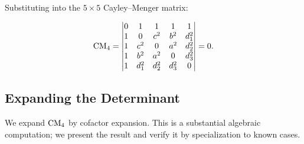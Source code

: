 Substituting into the $5 \times 5$ Cayley--Menger matrix:

\begin{equation}
\label{eq:cm-vdpp}
\mathrm{CM}_4 = \begin{vmatrix}
0 & 1 & 1 & 1 & 1 \\
1 & 0 & c^2 & b^2 & d_1^2 \\
1 & c^2 & 0 & a^2 & d_2^2 \\
1 & b^2 & a^2 & 0 & d_3^2 \\
1 & d_1^2 & d_2^2 & d_3^2 & 0
\end{vmatrix} = 0.
\end{equation}

\subsection{Expanding the Determinant}

We expand $\mathrm{CM}_4$ by cofactor expansion. This is a substantial algebraic computation; we present the result and verify it by specialization to known cases.

